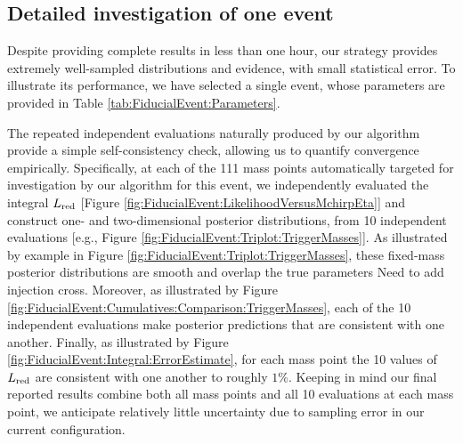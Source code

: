 \documentclass[twocolumn,prd,nofootinbib]{revtex4}
\newcommand\editremark[1]{{\color{red} #1}}
\begin{document}
\subsection{Detailed investigation of one event}
%    

Despite providing complete results in less than one hour, our strategy provides extremely well-sampled distributions and
evidence, with small statistical error.   To illustrate its performance, we have selected a single event, whose
parameters are provided in Table \ref{tab:FiducialEvent:Parameters}.   
%



The repeated independent evaluations naturally produced by our algorithm provide a simple self-consistency check,
allowing us to quantify convergence empirically.  
Specifically, at each of the 111 mass points automatically targeted for investigation by our algorithm for this event, we
independently evaluated the integral $L_{\rm red}$ [Figure \ref{fig:FiducialEvent:LikelihoodVersusMchirpEta}] and construct one- and two-dimensional posterior distributions, from
10 independent evaluations [e.g., Figure \ref{fig:FiducialEvent:Triplot:TriggerMasses}].    
%
As illustrated by example in Figure \ref{fig:FiducialEvent:Triplot:TriggerMasses}, these fixed-mass posterior
distributions are smooth and overlap the true parameters \editremark{Need to add injection cross}.  
%
Moreover, as illustrated by Figure \ref{fig:FiducialEvent:Cumulatives:Comparison:TriggerMasses}, each of the 10
independent evaluations make posterior predictions that are consistent with one another.   
%
Finally, as illustrated by Figure \ref{fig:FiducialEvent:Integral:ErrorEstimate}, for each mass point the 10 values of $L_{\rm red}$
are consistent with one another to roughly $1\%$.  
%
Keeping in mind our final reported results combine both all mass points and all 10 evaluations at each mass point, we
anticipate relatively little uncertainty due to sampling error in our current configuration.  
\end{document}
